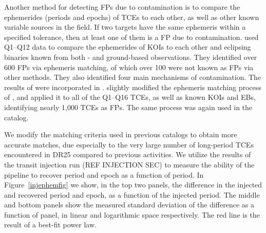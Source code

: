 Another method for detecting FPs due to contamination is to compare the ephemerides (periods and epochs) of TCEs to each other, as well as other known variable sources in the \kepler{} field. If two targets have the same ephemeris within a specified tolerance, then at least one of them is a FP due to contamination. \citet{Coughlin2014a} used Q1--Q12 data to compare the ephemerides of KOIs to each other and eclipsing binaries known from both \kepler{}- and ground-based observations. They identified over 600 FPs via ephemeris matching, of which over 100 were not known as FPs via other methods. They also identified four main mechanisms of contamination. The results of \citet{Coughlin2014a} were incorporated in \citet[][see \S3.3]{Rowe2015a}. \citet[][see \S5.3]{Mullally2015cat} slightly modified the ephemeris matching process of \citet{Coughlin2014a}, and applied it to all of the Q1--Q16 TCEs, as well as known KOIs and EBs, identifying nearly 1,000 TCEs as FPs. The same process was again used in the \citet{Coughlin2016} catalog.

We modify the matching criteria used in previous catalogs to obtain more accurate matches, due especially to the very large number of long-period TCEs encountered in DR25 compared to previous activities. We utilize the results of the transit injection run (REF INJECTION SEC) to measure the ability of the \kepler{} pipeline to recover period and epoch as a function of period. In Figure~\ref{injephemfig} we show, in the top two panels, the difference in the injected and recovered period and epoch, as a function of the injected period. The middle and bottom panels show the measured standard deviation of the difference as a function of panel, in linear and logarithmic space respectively. The red line is the result of a best-fit power law.

